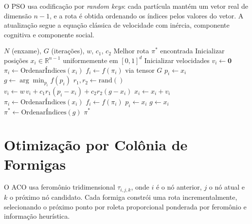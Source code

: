 O \ac{PSO} usa codificação por \textit{random keys}: cada partícula mantém um vetor real de dimensão $n-1$, e a rota é obtida ordenando os índices pelos valores do vetor. A atualização segue a equação clássica de velocidade com inércia, componente cognitiva e componente social.

\begin{algorithm}[htbp]
\caption{PSO com Random Keys para TSP-SD-ATP}
\label{alg:pso}
\begin{algorithmic}[1]
\REQUIRE $N$ (enxame), $G$ (iterações), $w$, $c_1$, $c_2$
\ENSURE Melhor rota $\pi^*$ encontrada
\STATE Inicializar posições $x_i \in \mathbb{R}^{n-1}$ uniformemente em $[0,1]^d$
\STATE Inicializar velocidades $v_i \leftarrow \mathbf{0}$
  \STATE $\pi_i \leftarrow \text{OrdenarÍndices}(x_i)$
  \STATE $f_i \leftarrow f(\pi_i)$ via tensor $G$
  \STATE $p_i \leftarrow x_i$ 
\ENDFOR
\STATE $g \leftarrow \arg\min_{p_i} f(p_i)$ 
    \STATE $r_1, r_2 \leftarrow \text{rand}()$
    \STATE $v_i \leftarrow w\,v_i + c_1 r_1 (p_i - x_i) + c_2 r_2 (g - x_i)$
    \STATE $x_i \leftarrow x_i + v_i$
    \STATE $\pi_i \leftarrow \text{OrdenarÍndices}(x_i)$
    \STATE $f_i \leftarrow f(\pi_i)$
      \STATE $p_i \leftarrow x_i$
    \ENDIF
      \STATE $g \leftarrow x_i$
    \ENDIF
  \ENDFOR
\ENDFOR
\STATE $\pi^* \leftarrow \text{OrdenarÍndices}(g)$
\RETURN $\pi^*$
\end{algorithmic}
\end{algorithm}

\section{Otimização por Colônia de Formigas}

O \ac{ACO} usa feromônio tridimensional $\tau_{i,j,k}$, onde $i$ é o nó anterior, $j$ o nó atual e $k$ o próximo nó candidato. Cada formiga constrói uma rota incrementalmente, selecionando o próximo ponto por roleta proporcional ponderada por feromônio e informação heurística.

